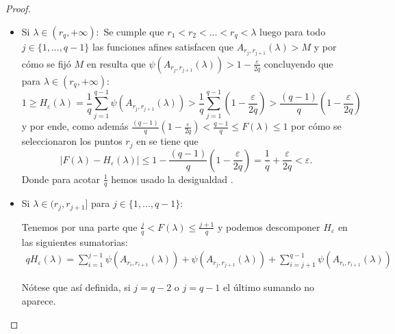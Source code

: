 \begin{proof}
\begin{itemize}
        \item Si $\lambda \in (r_q, +\infty):$
        Se cumple que $r_1 < r_2 <...< r_q <\lambda$ luego  
        para todo $j \in \{1, ..., q-1\}$ las funciones afines satisfacen que  
        $A_{r_j, r_{j+1}}(\lambda) > M$ y por cómo se fijó $M$ en 
        resulta que  $\psi( A_{r_j, r_{j+1}}(\lambda)) > 1-\frac{\varepsilon}{2q}$ concluyendo que 
        para $\lambda \in (r_q,+\infty):$
        \begin{equation}
            1 \geq
            H_\varepsilon(\lambda) = \frac{1}{q} \sum^{q-1}_{j=1} \psi( A_{r_j, r_{j+1}}(\lambda)) 
            >
                \frac{1}{q} \sum^{q-1}_{j=1}  \left(1-\frac{\varepsilon}{2q} \right)
            >
            \frac{(q-1)}{q}  \left(1-\frac{\varepsilon}{2q} \right)   
        \end{equation}
        y por ende, como además $\frac{(q-1)}{q}  \left(1-\frac{\varepsilon}{2q} \right) <  \frac{q-1}{q} \leq F(\lambda) \leq 1$ por cómo se seleccionaron los puntos $r_j$ en 
         se tiene que 
        \begin{equation}
            | F(\lambda) - H_{\varepsilon}(\lambda) | 
            \leq
            1 - \frac{(q-1)}{q}  \left(1-\frac{\varepsilon}{2q} \right)
            = \frac{1}{q} + \frac{\varepsilon}{2q}
            < \varepsilon.
        \end{equation}
        Donde para acotar $\frac{1}{q}$ hemos usado la desigualdad .

        \item Si $\lambda \in (r_{j},r_{j+1}]$ para $j \in \{ 1, \ldots, q-1\}$: 
        
        Tenemos por una parte que $\frac{j}{q} < F(\lambda) \leq \frac{j+1}{q}$ y 
        podemos descomponer $H_\varepsilon$ en las siguientes sumatorias: 
        \begin{equation}
            \begin{split}
                q H_\varepsilon(\lambda) 
                = 
                 \sum^{j-1}_{i=1} \psi( A_{r_i, r_{i+1}}(\lambda))
                + 
                \psi( A_{r_j, r_{j+1}}(\lambda))
                + 
                \sum^{q-1}_{i=j+1} \psi( A_{r_i, r_{i+1}}(\lambda))
            \end{split}
        \end{equation}

        Nótese que así definida, si $j = q-2$ o $j = q -1$ el último sumando no aparece. 


\end{itemize}
\end{proof}
